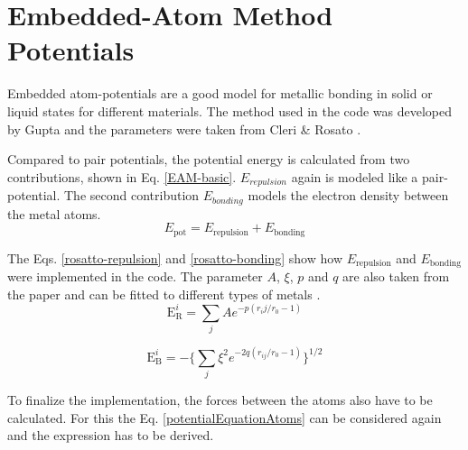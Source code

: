 \section{Embedded-Atom Method Potentials}
\begin{comment}
- describe Units 
- better discribed in the course
- good model for metalic systems
- work with gold clusters 

\end{comment}
Embedded atom-potentials are a good model for metallic bonding in solid or liquid states for different materials. The method used in the code was developed by Gupta \cite{gupta} and the parameters were taken from  Cleri \& Rosato \cite{rosato}. 
\par 
\begin{comment}
pair potentials cant model crystals as they have 3 independet elastic constants
put pair potentials have only two -> cauchy pressure
rather heuristic description in the lecture, like basic chemistry
E_pot = E_repulsion + E_embedding (embedding energy is connected to electric density)
E_repulustion is typically a pair potential
E_emedding is a funtiunal of the density in r
\end{comment}
Compared to pair potentials, the potential energy is calculated from two contributions, shown in Eq. \ref{EAM-basic}. $E_{repulsion}$ again is modeled like a pair-potential. The second contribution $E_{bonding}$ models the electron density between the metal atoms. 
\begin{equation}
	\label{EAM-basic}
	E_{\mathrm{pot}}  = E_{\mathrm{repulsion}} + E_{\mathrm{bonding}}
\end{equation}
 
The Eqs. \ref{rosatto-repulsion} and \ref{rosatto-bonding} show how $E_{\mathrm{repulsion}}$ and $E_{\mathrm{bonding}}$ were implemented in the code. The parameter $A$,  $\xi$, $p$ and $q$ are also taken from the paper and can be fitted to different types of metals \cite{rosato}. 
\begin{equation}
 	\label{rosatto-repulsion}
 	\mathrm{E}_{\mathrm{R}}^{i} = \sum_{j} A e^{-p(r_ij/r_{0} - 1)}
 \end{equation}

\begin{equation}
	\label{rosatto-bonding}
	\mathrm{E}_{\mathrm{B}}^{i} = - \big\{\sum_{j}\xi^{2} e^{-2q(r_{ij}/r_{0}-1)} \big\}^{1/2}
\end{equation}

To finalize the implementation, the forces between the atoms also have to be calculated. For this the Eq. \ref{potentialEquationAtoms} can be considered again and the expression has to be derived.
